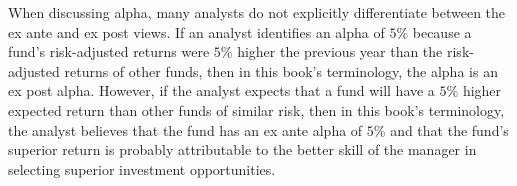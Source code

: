 \documentclass[11pt]{article}
\begin{document}
When discussing alpha, many analysts do not explicitly differentiate between the ex ante and ex post views. If an analyst identifies an alpha of $5 \%$ because a fund's risk-adjusted returns were $5 \%$ higher the previous year than the risk-adjusted returns of other funds, then in this book's terminology, the alpha is an ex post alpha. However, if the analyst expects that a fund will have a $5 \%$ higher expected return than other funds of similar risk, then in this book's terminology, the analyst believes that the fund has an ex ante alpha of $5 \%$ and that the fund's superior return is probably attributable to the better skill of the manager in selecting superior investment opportunities.
\end{document}
